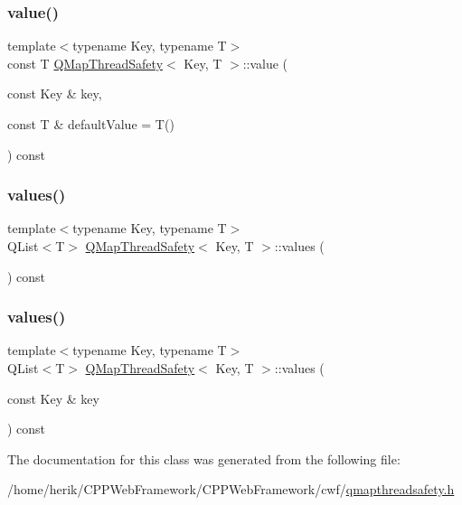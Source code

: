 \subsubsection{\texorpdfstring{value()}{value()}}
{\footnotesize\ttfamily template$<$typename Key, typename T$>$ \\
const T \hyperlink{class_q_map_thread_safety}{Q\+Map\+Thread\+Safety}$<$ Key, T $>$\+::value (\begin{DoxyParamCaption}\item[{const Key \&}]{key,  }\item[{const T \&}]{default\+Value = {\ttfamily T()} }\end{DoxyParamCaption}) const\hspace{0.3cm}{\ttfamily [inline]}}

\mbox{\label{class_q_map_thread_safety_a6395316e7fec3faea0dcf150a3dab897}} 
\subsubsection{\texorpdfstring{values()}{values()}\hspace{0.1cm}{\footnotesize\ttfamily [1/2]}}
{\footnotesize\ttfamily template$<$typename Key, typename T$>$ \\
Q\+List$<$T$>$ \hyperlink{class_q_map_thread_safety}{Q\+Map\+Thread\+Safety}$<$ Key, T $>$\+::values (\begin{DoxyParamCaption}{ }\end{DoxyParamCaption}) const\hspace{0.3cm}{\ttfamily [inline]}}

\mbox{\label{class_q_map_thread_safety_afffdf1fc9bd98f9bfede07549533da53}} 
\subsubsection{\texorpdfstring{values()}{values()}\hspace{0.1cm}{\footnotesize\ttfamily [2/2]}}
{\footnotesize\ttfamily template$<$typename Key, typename T$>$ \\
Q\+List$<$T$>$ \hyperlink{class_q_map_thread_safety}{Q\+Map\+Thread\+Safety}$<$ Key, T $>$\+::values (\begin{DoxyParamCaption}\item[{const Key \&}]{key }\end{DoxyParamCaption}) const\hspace{0.3cm}{\ttfamily [inline]}}



The documentation for this class was generated from the following file\+:\begin{DoxyCompactItemize}
\item 
/home/herik/\+C\+P\+P\+Web\+Framework/\+C\+P\+P\+Web\+Framework/cwf/\hyperlink{qmapthreadsafety_8h}{qmapthreadsafety.\+h}\end{DoxyCompactItemize}
